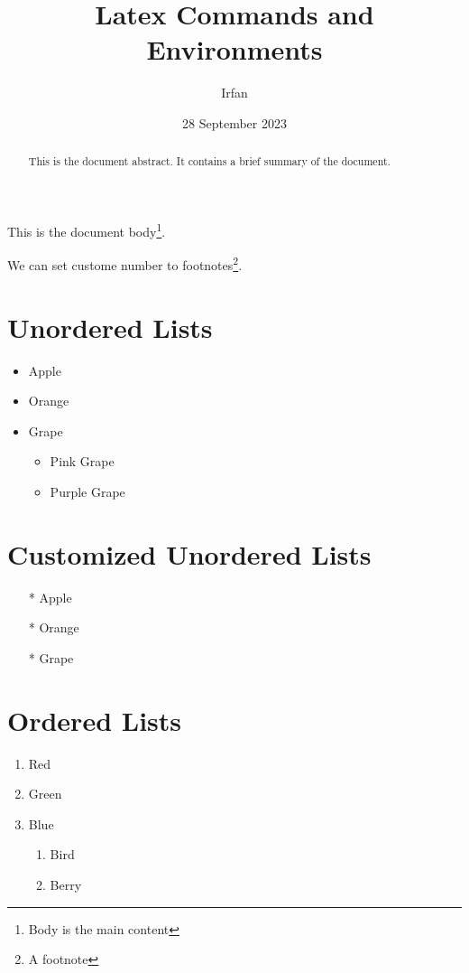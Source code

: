 \documentclass{article}
\title{Latex Commands and Environments}
\author{Irfan}
\date{28 September 2023}
\begin{document}
\maketitle


\begin{abstract}
  This is the document abstract. It contains a brief summary of the document.
\end{abstract}

This is the document body\footnote{Body is the main content}.

We can set custome number to footnotes\footnote[5]{A footnote}.

\section{Unordered Lists}
\begin{itemize}
  \item Apple
  \item Orange
  \item Grape
  \begin{itemize} %
    \item Pink Grape
    \item Purple Grape
  \end{itemize}
\end{itemize}

\section{Customized Unordered Lists}
\begin{itemize}
  \item[*] Apple
  \item[*] Orange
  \item[*] Grape
\end{itemize}

\section{Ordered Lists}
\begin{enumerate}
  \item Red
  \item Green
  \item Blue
  \begin{enumerate} %
    \item Bird
    \item Berry
  \end{enumerate}
\end{enumerate}
\end{document}
